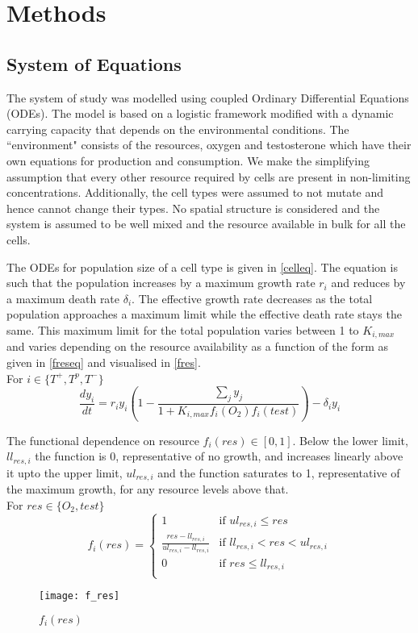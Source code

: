 \chapter{Methods}

\section{System of Equations}
The system of study was modelled using coupled Ordinary Differential Equations (ODEs). The model is based on a logistic framework modified with a dynamic carrying capacity that depends on the environmental conditions. The ``environment" consists of the resources, oxygen and testosterone which have their own equations for production and consumption. We make the simplifying assumption that every other resource required by cells are present in non-limiting concentrations. Additionally, the cell types were assumed to not mutate and hence cannot change their types. No spatial structure is considered and the system is assumed to be well mixed and the resource available in bulk for all the cells.

The ODEs for population size of a cell type is given in \autoref{celleq}. The equation is such that the population increases by a maximum growth rate $r_i$ and reduces by a maximum death rate $\delta_i$. The effective growth rate decreases as the total population approaches a maximum limit while the effective death rate stays the same. This maximum limit for the total population varies between 1 to $K_{i,max}$ and varies depending on the resource availability as a function of the form as given in \autoref{freseq} and visualised in \autoref{fres}.\\
For $i \in \{T^+,T^p,T^-\}$
\begin{equation}
  \frac{dy_i}{dt} = r_i y_i (1 - \frac{\sum_j y_j}{1 + K_{i,max} f_i(O_2) f_i(test)} )- \delta_i y_i
  \label{celleq}
\end{equation}

The functional dependence on resource $f_i(res) \in [0,1]$. Below the lower limit, $ll_{res,i}$ the function is 0, representative of no growth, and increases linearly above it upto the upper limit, $ul_{res,i}$ and the function saturates to 1, representative of the maximum growth, for any resource levels above that.\\
For $res \in \{O_2,test\}$
\begin{equation}
f_i(res) = \begin{cases}
1 &\text{if } ul_{res,i} \leq res \\
\frac{res-ll_{res,i}}{ul_{res,i}-ll_{res,i}} &\text{if } ll_{res,i} < res < ul_{res,i} \\
0 &\text{if } res \leq ll_{res,i} \\
\end{cases}
\label{freseq}
\end{equation}
\begin{figure}[h]
  \centering
  \texttt{[image: f\_res]}
  \caption{$f_i(res)$}
  \label{fres}
\end{figure}

